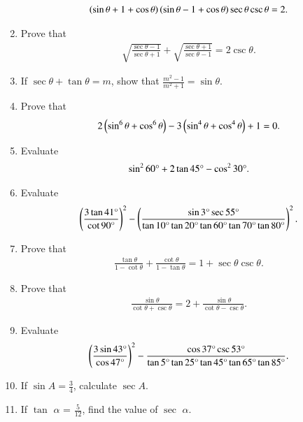 \begin{enumerate}[label=\thesubsection.\arabic*,ref=\thesubsection.\theenumi,itemsep=1pt]
\begin{align*}
    \left(\sin \theta+1+\cos \theta\right) \left(\sin\theta-1+\cos\theta\right)\sec\theta \csc\theta=2
.\end{align*}
\hfill{}\item Prove that 
\begin{align*}
      \sqrt{\frac{\sec\theta-1}{\sec\theta+1}} + \sqrt{\frac{\sec\theta+1}{\sec\theta-1}} = 2\csc\theta
.\end{align*}
\hfill{}\item If $\sec\theta + \tan\theta=m$, show that $\frac{m^2-1}{m^2+1} = \sin\theta$.
\hfill{}\item Prove that 
\begin{align*}
    2 \left(\sin^6\theta +\cos^6\theta\right) - 3 \left(\sin^4\theta + \cos^4\theta\right) + 1 = 0
.\end{align*}
\hfill{}
\item Evaluate 
 \begin{align*}
	     \sin^{2}{60\degree} + 2\tan{45\degree} - \cos^{2}{30\degree}. 
      \end{align*}
\hfill{}\item Evaluate 
\begin{align*}
\left(\frac{3\tan 41\degree}{\cot 90\degree}\right)^2 - \left(\frac{\sin 3\degree \sec 55\degree}{\tan 10\degree \tan 20\degree \tan 60\degree \tan 70\degree \tan 80\degree}\right)^2
.\end{align*}
\hfill{}\item Prove that 
\begin{align*}
\frac{\tan \theta}{1-\cot \theta} + \frac{\cot \theta}{1- \tan \theta} = 1+ \sec \theta  \csc  \theta   
.\end{align*}
\hfill{}\item Prove that 
\begin{align*}
    \frac{\sin \theta}{\cot \theta + \csc \theta} = 2 + \frac{\sin \theta}{\cot \theta - \csc \theta}
.\end{align*}
\hfill{}\item Evaluate 
\begin{align*}
\left(\frac{3\sin 43\degree}{\cos 47\degree}\right)^2 - \frac{\cos 37\degree \csc 53\degree}{\tan 5\degree \tan 25\degree \tan 45\degree \tan 65\degree \tan 85\degree}
.\end{align*}
 \hfill{}\item If $\sin A = \frac{3}{4}$, calculate $\sec A$.
\hfill{}\item If $\tan$ $\alpha$ = ${\frac {5}{12}}$, find the value of $\sec$ $\alpha$.

\end{enumerate}
